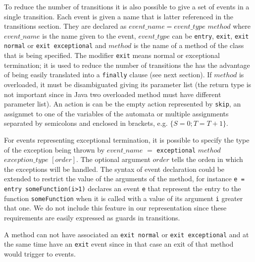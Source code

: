 \documentclass[a4paper,10pt]{article}
\theoremstyle{definition}
\begin{document}
To reduce the number of transitions it is also possible to give a set of events in a single transition. Each
event is given a name that is latter referenced in the transitions section. They are declared as $event\_name
= event\_type\,\, method$ where $event\_name$ is the name given to the event, $event\_type$ can be
\texttt{entry}, \texttt{exit}, \texttt{exit normal} or \texttt{exit exceptional} and $method$ is the name of a
method of the class that is being specified. The modifier \texttt{exit} means normal or exceptional
termination; it is used to reduce the number of transitions the has the advantage of being easily translated
into a \texttt{finally} clause (see next section).
If $method$ is overloaded, it must be disambiguated giving its parameter list (the return type is not
important since in Java two overloaded method must have different parameter list). An action is can be the
empty action represented by \texttt{skip}, an assignmet to one of the variables of the automata or multiple
assignments separated by semicolons and enclosed in brackets, e.g. $\{S = 0; T = T+1\}$.

For events representing exceptional termination, it is possible to specify the type of the exception being
thrown by $event\_name$ $=$ \texttt{exceptional} $method$ $exception\_type$ $[order]$. The optional argument
$order$ tells the orden in which the exceptions will be handled.
The syntax of event declaration could be extended to restrict the value of the arguments of the method, for
instance \texttt{e = entry someFunction(i>1)} declares an event \texttt{e} that represent the entry to the
function \texttt{someFunction} when it is called with a value of its argument \texttt{i} greater that one. We
do not include this feature in our representation since these requirements are easily expressed as guards in
transitions.

A method can not have associated an \texttt{exit normal} or \texttt{exit exceptional} and at the same time
have an \texttt{exit} event since in that case an exit of that method would trigger to events.

\end{document}
